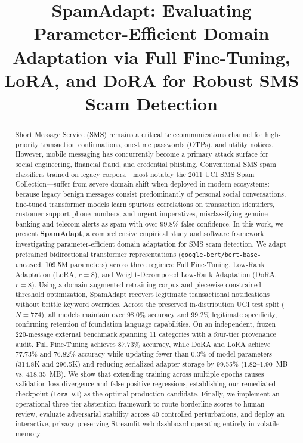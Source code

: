 \documentclass[conference]{IEEEtran}
\title{SpamAdapt: Evaluating Parameter-Efficient Domain Adaptation via Full Fine-Tuning, LoRA, and DoRA for Robust SMS Scam Detection}
\author{
    \IEEEauthorblockN{Akash Uchachariya\IEEEauthorrefmark{1}, Umang Mori\IEEEauthorrefmark{1}, and Keval Bamarotiya\IEEEauthorrefmark{1}}
    \IEEEauthorblockA{\IEEEauthorrefmark{1}Department of Computer Science and Engineering\\
    [Institution / University Name Placeholder], [City, Country Placeholder]\\
    Email: \{[akash.uchachariya], [umang.mori], [keval.bamarotiya]\}@institution.edu Placeholder}
}
\begin{document}
\maketitle

\begin{abstract}
Short Message Service (SMS) remains a critical telecommunications channel for high-priority transaction confirmations, one-time passwords (OTPs), and utility notices. However, mobile messaging has concurrently become a primary attack surface for social engineering, financial fraud, and credential phishing. Conventional SMS spam classifiers trained on legacy corpora—most notably the 2011 UCI SMS Spam Collection—suffer from severe domain shift when deployed in modern ecosystems: because legacy benign messages consist predominantly of personal social conversations, fine-tuned transformer models learn spurious correlations on transaction identifiers, customer support phone numbers, and urgent imperatives, misclassifying genuine banking and telecom alerts as spam with over 99.8\% false confidence. In this work, we present \textbf{SpamAdapt}, a comprehensive empirical study and software framework investigating parameter-efficient domain adaptation for SMS scam detection. We adapt pretrained bidirectional transformer representations (\texttt{google-bert/bert-base-uncased}, 109.5M parameters) across three regimes: Full Fine-Tuning, Low-Rank Adaptation (LoRA, $r=8$), and Weight-Decomposed Low-Rank Adaptation (DoRA, $r=8$). Using a domain-augmented retraining corpus and piecewise constrained threshold optimization, SpamAdapt recovers legitimate transactional notifications without brittle keyword overrides. Across the preserved in-distribution UCI test split ($N=774$), all models maintain over 98.0\% accuracy and 99.2\% legitimate specificity, confirming retention of foundation language capabilities. On an independent, frozen 220-message external benchmark spanning 11 categories with a four-tier provenance audit, Full Fine-Tuning achieves 87.73\% accuracy, while DoRA and LoRA achieve 77.73\% and 76.82\% accuracy while updating fewer than 0.3\% of model parameters (314.8K and 296.5K) and reducing serialized adapter storage by 99.55\% (1.82--1.90~MB vs. 418.35~MB). We show that extending training across multiple epochs causes validation-loss divergence and false-positive regressions, establishing our remediated checkpoint (\texttt{lora\_v3}) as the optimal production candidate. Finally, we implement an operational three-tier abstention framework to route borderline scores to human review, evaluate adversarial stability across 40 controlled perturbations, and deploy an interactive, privacy-preserving Streamlit web dashboard operating entirely in volatile memory.
\end{abstract}
\end{document}

